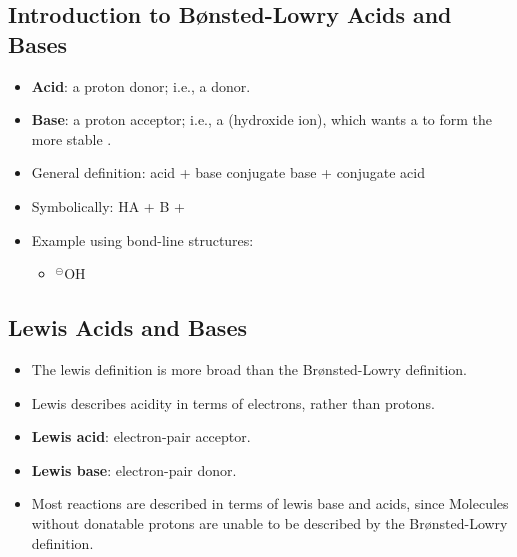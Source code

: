 \documentclass[12pt,a4paper]{article}
\begin{document}
\subsection{Introduction to B{\o}nsted-Lowry Acids and Bases}
\begin{itemize}
    \item \textbf{Acid}: a {\color{o-Sun}proton donor}; i.e., a {\color{pos}} donor.
    \item \textbf{Base}: a {\color{o-Sun}proton acceptor}; i.e., a {\color{neg}} (hydroxide ion), which wants a {\color{pos}} to form the more stable .
    \item General definition: {\color{pos}acid} + {\color{neg}base} \ch{<>} {\color{neg}conjugate base} + {\color{pos}conjugate acid}
    \item Symbolically: {\color{pos}HA} + {\color{neg}B} \ch{<>} {\color{neg}} + {\color{pos}}
    \item Example using bond-line structures:
        \begin{itemize}
            \item 
            \hspace{6pt}{\large+}\hspace{6pt}
            \hspace{6pt}{\large\ch{<>}}\hspace{6pt}
            {\color{neg}$^\circleddash$O}H
            \hspace{6pt}{\large+}\hspace{6pt}
    \end{itemize}
\end{itemize}

\subsection{Lewis Acids and Bases}
\begin{itemize}
    \item The lewis definition is more broad than the Br{\o}nsted-Lowry definition.
    \item Lewis describes acidity in terms of {\color{o-Sun}electrons}, rather than protons.
    \item \textbf{Lewis acid}: electron-pair {\color{o-Sun}acceptor}.
    \item \textbf{Lewis base}: electron-pair {\color{o-Sun}donor}.
    \item Most reactions are described in terms of lewis base and acids, since Molecules without donatable protons are unable to be described by the Br{\o}nsted-Lowry definition.
\end{itemize}
\end{document}
